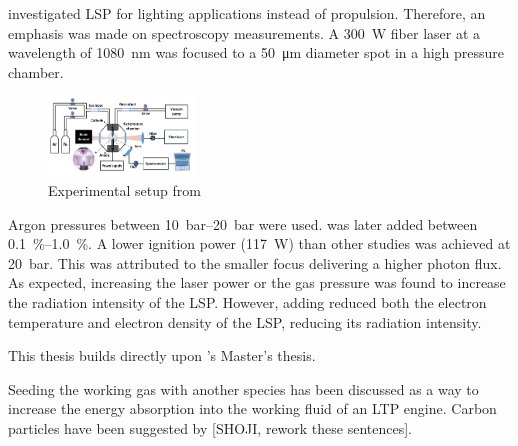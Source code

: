 

        \textcite{luCharacteristicDiagnosticsLaserStabilized2022a} investigated LSP for lighting applications instead of propulsion. Therefore, an emphasis was made on spectroscopy measurements. A \qty{300}{W} fiber laser at a wavelength of \qty{1080}{nm} was focused to a \qty{50}{μm} diameter spot in a high pressure chamber.
        
        \begin{figure}[h]
            \centering
            \includegraphics[width=0.35\textwidth]{assets/2 background/Lu apparatus.png}
            \caption{Experimental setup from \textcite{luCharacteristicDiagnosticsLaserStabilized2022a}}
            \label{fig:Lu apparatus}
        \end{figure}

        Argon pressures between \qtyrange{10}{20}{bar} were used.  was later added between \qtyrange{0.1}{1.0}{\%}. A lower ignition power (\qty{117}{W}) than other studies was achieved at \qty{20}{bar}. This was attributed to the smaller focus delivering a higher photon flux. As expected, increasing the laser power or the gas pressure was found to increase the radiation intensity of the LSP. However, adding  reduced both the electron temperature and electron density of the LSP, reducing its radiation intensity.


        This thesis builds directly upon \textcite{duplayArgonLaserPlasmaThruster2024a}'s Master's thesis.

        Seeding the working gas with another species has been discussed as a way to increase the energy absorption into the working fluid of an LTP engine. Carbon particles have been suggested by [SHOJI, rework these sentences].


